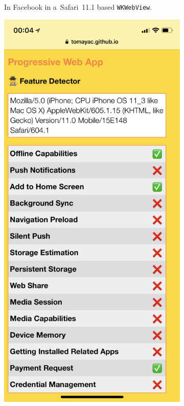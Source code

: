 \documentclass[sigconf]{acmart}
\begin{document}
\begin{figure}[t]
\begin{subfigure}[t]{0.475\columnwidth}
    \caption[\textsc{pwa} Feature Detector running in Facebook.]{
      In Facebook in a~Safari~11.1 based \texttt{WKWebView}.}
    \label{fig:facebook-ios-safari11_1}
  \end{subfigure}    
  \quad
  \begin{subfigure}[t]{0.475\columnwidth}  
    \includegraphics[width=1\columnwidth,frame]{pwa-feature-detector-twitter-ios-safari11_1}

\end{subfigure}
\end{figure}
\end{document}
